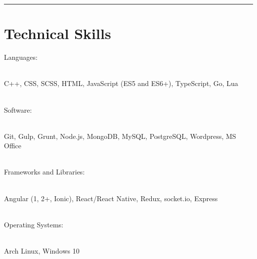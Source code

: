 \noindent\rule{0.9\hsize}{0.4pt}
\section{\normalsize{Technical Skills}}

Languages:\\\\
\parbox{\dimexpr\linewidth-2\fboxsep-2\fboxrule}{C++, CSS, SCSS, HTML, JavaScript (ES5 and ES6+), TypeScript, Go, Lua}
\vspace{2\baselineskip}
\\
Software:\\\\
\parbox{\dimexpr\linewidth-2\fboxsep-2\fboxrule}{Git, Gulp, Grunt, Node.js, MongoDB, MySQL, PostgreSQL, Wordpress, MS Office}
\vspace{2\baselineskip}
\\
Frameworks and Libraries:\\\\
\parbox{\dimexpr\linewidth-2\fboxsep-2\fboxrule}{Angular (1, 2+, Ionic), React/React Native, Redux, socket.io, Express}
\vspace{2\baselineskip}
\\
Operating Systems:\\\\
\parbox{\dimexpr\linewidth-2\fboxsep-2\fboxrule}{Arch Linux, Windows 10}
\\
